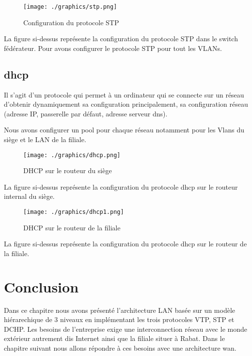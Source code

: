 \documentclass[12pt,a4paper]{report}
\begin{document}
		\begin{figure}[!hbtp]
			\centering
			\texttt{[image: ./graphics/stp.png]}
			\caption{Configuration du protocole STP}
		\end{figure}

		La figure si-dessus représente la configuration du protocole STP dans le switch fédérateur. Pour avons configurer le protocole STP pour tout les VLANs.

		\subsection{\ac{dhcp}}
		Il s'agit d'un protocole qui permet à un ordinateur qui se connecte sur un réseau d'obtenir dynamiquement sa configuration principalement, sa configuration réseau (adresse IP, passerelle par défaut, adresse serveur \ac{dns}).

		\newpage 

		Nous avons configurer un pool pour chaque réseau notamment pour les Vlans du siège et le LAN de la filiale.

		\begin{figure}[!hbtp]
			\centering
			\texttt{[image: ./graphics/dhcp.png]}
			\caption{DHCP sur le routeur du siège}
		\end{figure}
		La figure si-dessus représente la configuration du protocole \ac{dhcp} sur le routeur internal du siège.

		\begin{figure}[!hbtp]
			\centering
			\texttt{[image: ./graphics/dhcp1.png]}
			\caption{DHCP sur le routeur de la filiale}
		\end{figure}
		La figure si-dessus représente la configuration du protocole \ac{dhcp} sur le routeur de la filiale.

		\section{Conclusion}
Dans ce chapitre nous avons présenté l'architecture LAN basée sur un modèle hiérarechique de 3 niveaux en implémentant les trois protocoles VTP, STP et DCHP. Les besoins de l'entreprise exige une interconnection réseau avec le monde extérieur autrement dis Internet ainsi que la filiale situer à Rabat. Dans le chapitre suivant nous allons répondre à ces besoins avec une architecture \ac{wan}.	
		

		\newpage
		
		
\end{document}
